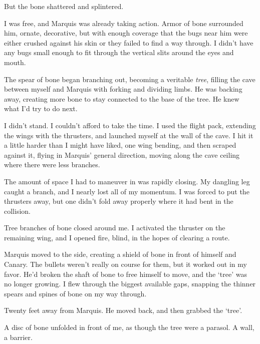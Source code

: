 But the bone shattered and splintered.



I was free, and Marquis was already taking action.  Armor of bone surrounded him, ornate, decorative, but with enough coverage that the bugs near him were either crushed against his skin or they failed to find a way through.  I didn't have any bugs small enough to fit through the vertical slits around the eyes and mouth.



The spear of bone began branching out, becoming a veritable \emph{tree}, filling the cave between myself and Marquis with forking and dividing limbs.  He was backing away, creating more bone to stay connected to the base of the tree.  He knew what I'd try to do next.



I didn't stand.  I couldn't afford to take the time.  I used the flight pack, extending the wings with the thrusters, and launched myself at the wall of the cave.  I hit it a little harder than I might have liked, one wing bending, and then scraped against it, flying in Marquis' general direction, moving along the cave ceiling where there were less branches.



The amount of space I had to maneuver in was rapidly closing. My dangling leg caught a branch, and I nearly lost all of my momentum.  I was forced to put the thrusters away, but one didn't fold away properly where it had bent in the collision.



Tree branches of bone closed around me.  I activated the thruster on the remaining wing, and I opened fire, blind, in the hopes of clearing a route.



Marquis moved to the side, creating a shield of bone in front of himself and Canary.  The bullets weren't really on course for them, but it worked out in my favor.  He'd broken the shaft of bone to free himself to move, and the `tree' was no longer growing.  I flew through the biggest available gaps, snapping the thinner spears and spines of bone on my way through.



Twenty feet away from Marquis.  He moved back, and then grabbed the `tree'.



A disc of bone unfolded in front of me, as though the tree were a parasol.  A wall, a barrier.



